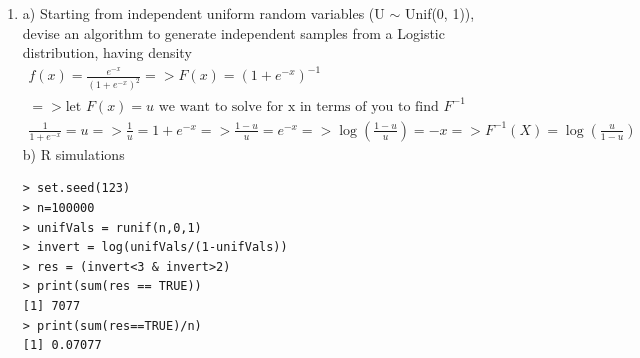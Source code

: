 \documentclass[11pt]{article}
\begin{document}
\begin{enumerate}
\begin{enumerate}
\end{enumerate}
\item a) Starting from independent uniform random variables (U $\sim$ Unif(0, 1)), devise an algorithm to generate independent samples from a Logistic distribution, having density
\begin{gather}
	f(x) = \frac{e^{-x}}{(1+e^{-x})^2} => F(x) = (1+e^{-x})^{-1}\\
	=> \text{let } F(x) = u \text{ we want to solve for x in terms of you to find  } F^{-1} \\
	\frac{1}{1+e^{-x}} = u => \frac{1}{u} = 1+e^{-x} => \frac{1-u}{u} = e^{-x} => \log(\frac{1-u}{u}) = -x => F^{-1}(X) = \log(\frac{u}{1-u})
\end{gather}
b) R simulations
\begin{verbatim}
> set.seed(123)
> n=100000
> unifVals = runif(n,0,1)
> invert = log(unifVals/(1-unifVals))
> res = (invert<3 & invert>2)
> print(sum(res == TRUE))
[1] 7077
> print(sum(res==TRUE)/n)
[1] 0.07077
\end{verbatim}
\end{enumerate}
\end{document}
